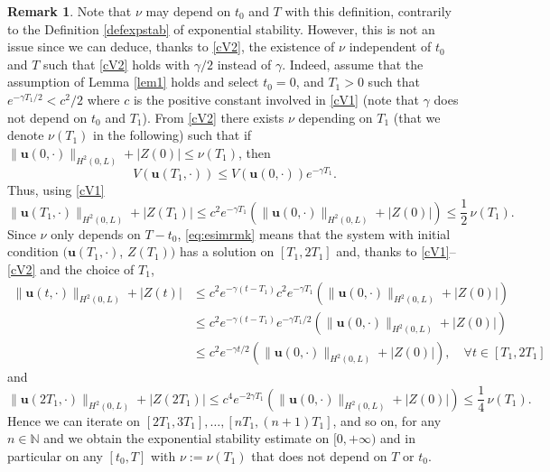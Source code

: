 \documentclass[11pt]{article}
\numberwithin{equation}{section}
\theoremstyle{definition}
\newtheorem{rmk}[thm]{Remark}
\begin{document}
\begin{rmk}
Note that $\nu$ may depend on $t_{0}$ and $T$ with this definition, contrarily to the Definition \ref{defexpstab} of exponential stability. However, this is not an issue since we can deduce, thanks to \eqref{cV2}, the existence of $\nu$ independent of $t_{0}$ and $T$ such that \eqref{cV2} holds with $\gamma/2$ instead of $\gamma$. Indeed, assume that the assumption of Lemma \ref{lem1} holds and select $t_{0}=0$, and $T_{1}>0$ such that $e^{-\gamma T_{1}/2}<c^{2}/2$ where $c$ is the positive constant involved in \eqref{cV1} (note that $\gamma$ does not depend on $t_{0}$ and $T_{1}$). From \eqref{cV2} there exists $\nu$ depending on $T_{1}$ (that we denote $\nu(T_{1})$ in the following) such that if $\lVert \boldsymbol{u}({0},\cdot)\rVert_{H^{2}(0,L)}+|Z({0})|\leq {\nu}(T_{1})$, then
\begin{equation*}
V(\boldsymbol{u}(T_{1},\cdot))\leq V(\boldsymbol{u}(0,\cdot))e^{-\gamma T_{1}}.
\end{equation*}
Thus, using \eqref{cV1}
\begin{equation}
\label{eq:esimrmk}
\lVert \boldsymbol{u}(T_{1},\cdot)\rVert_{H^{2}(0,L)}+|Z(T_{1})|\leq c^{2}e^{-\gamma T_{1}}\left(\lVert \boldsymbol{u}({0},\cdot)\rVert_{H^{2}(0,L)}+|Z({0})|\right)\leq \frac{1}{2}\,\nu (T_{1}).
\end{equation}
Since $\nu$ only depends on $T-t_{0}$, \eqref{eq:esimrmk} means that the system with initial condition $(\boldsymbol{u}(T_{1},\cdot)$, $Z(T_{1}))$ has a solution on $[T_{1},2T_{1}]$ and, thanks to \eqref{cV1}--\eqref{cV2} and the choice of $T_{1}$,
\begin{equation*}
\begin{split}
\lVert \boldsymbol{u}(t,\cdot)\rVert_{H^{2}(0,L)}+|Z(t)|&\leq c^{2}e^{-\gamma(t-T_{1})}c^{2}e^{-\gamma T_{1}}\left(\lVert \boldsymbol{u}({0},\cdot)\rVert_{H^{2}(0,L)}+|Z({0})|\right)\\
&\leq c^{2}e^{-\gamma(t-T_{1})}e^{-\gamma T_{1}/2}\left(\lVert \boldsymbol{u}({0},\cdot)\rVert_{H^{2}(0,L)}+|Z({0})|\right)\\
&\leq c^{2}e^{-\gamma t/2}\left(\lVert \boldsymbol{u}({0},\cdot)\rVert_{H^{2}(0,L)}+|Z({0})|\right),\quad\forall t\in[T_{1},2T_{1}]
\end{split}
\end{equation*}
and
\begin{equation*}
\lVert \boldsymbol{u}(2T_{1},\cdot)\rVert_{H^{2}(0,L)}+|Z(2T_{1})|\leq c^{4}e^{-2\gamma T_{1}}\left(\lVert \boldsymbol{u}({0},\cdot)\rVert_{H^{2}(0,L)}+|Z({0})|\right)\leq \frac{1}{4}\,\nu (T_{1}).
\end{equation*}
Hence we can iterate on $[2T_{1}, 3T_{1}],\dots,[nT_{1},(n+1)T_{1}]$, and so on, for any $n\in\mathbb{N}$ and we obtain the exponential stability estimate on $[0,+\infty)$ and in particular on any $[t_{0},T]$ with $\nu := \nu(T_{1})$ that does not depend on $T$ or $t_{0}$.
\end{rmk}
\end{document}
